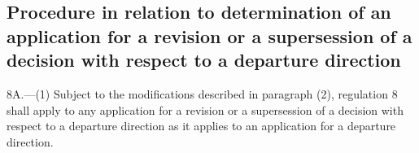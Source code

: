 \documentclass[12pt,a4paper]{article}
\begin{document}


\subsection[8A. Procedure in relation to determination of an application for a revision or a supersession of a decision with respect to a departure direction]{Procedure in relation to determination of an application for a revision or a supersession of a decision with respect to a departure direction}

8A.—(1) Subject to the modifications described in paragraph (2), regulation 8 shall apply to any application for a revision or a supersession of a decision with respect to a departure direction as it applies to an application for a departure direction.
\end{document}

